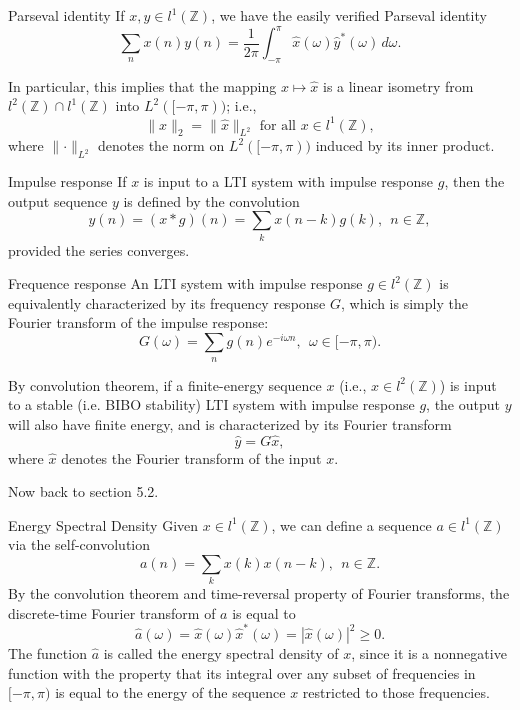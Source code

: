 \documentclass{article}
\begin{document}
\begin{misc}{Parseval identity}{}
If \( x,y \in l^1(\mathbb{Z} ) \), we have the easily verified Parseval identity
\[
    \sum_{n} x(n)y(n) = \frac{1}{2\pi }\int_{- \pi }^{\pi} \hat{x} (\omega )\hat{y} ^{\ast}(\omega )   \,d \omega  .
\]

In particular, this implies that the mapping \( x\mapsto \hat{x}   \) is a linear isometry from \( l^2(\mathbb{Z} ) \cap l^1 (\mathbb{Z} ) \) into \( L^2([-\pi, \pi )) \); i.e., 
\[
    \lVert x \rVert _2 = \lVert \hat{x}  \rVert _{L^2} \text{ for all } x \in  l^1(\mathbb{Z} ),
\] where \( \lVert \cdot  \rVert_{L^2}  \) denotes the norm on \( L^2([- \pi ,\pi )) \) induced by its inner product. 
\end{misc}


\begin{defn}{Impulse response}{}
    If \( x \) is input to a LTI system with impulse response \( g \), then the output sequence \( y \) is defined by the convolution 
    \[
        y(n) = (x \ast g)(n) = \sum_{k} x(n - k)g(k), \ \ n \in \mathbb{Z} ,
    \]
    provided the series converges. 
    \end{defn}
    
\begin{defn}{Frequence response}{}
An LTI system with impulse response \( g \in l^2(\mathbb{Z} ) \) is equivalently characterized by its frequency response \( G \), which is simply the Fourier transform of the impulse response:
\[
    G(\omega ) = \sum_{n} g(n)e^{- i \omega n}, \ \ \omega \in [- \pi , \pi ). 
\]
\end{defn}    
\begin{rmk}{}{}
    By convolution theorem, if a finite-energy sequence \( x \) (i.e., \( x\in l^2(\mathbb{Z} ) \)) is input to a stable (i.e. BIBO stability) LTI system with impulse response \( g \), the output \( y \) will also have finite energy, and is characterized by its Fourier transform
    \[
        \hat{y} = G \hat{x},
    \]
    where \( \hat{x}  \) denotes the Fourier transform of the input \( x \). 
\end{rmk}

Now back to section 5.2.



\begin{defn}{Energy Spectral Density}{}
Given \( x \in l^1(\mathbb{Z} )  \), we can define a sequence \( a \in l^1(\mathbb{Z} ) \) via the self-convolution 
\[
    a(n) = \sum_{k} x(k)x(n - k),  \ \ n \in \mathbb{Z}. 
\]
By the convolution theorem and time-reversal property of Fourier transforms, the discrete-time Fourier transform of \( a \) is equal to 
\[
    \hat{a} (\omega ) = \hat{x} (\omega )\hat{x} ^{\ast} (\omega ) = |\hat{x} (\omega )| ^{2} \geq 0. 
\]
The function \( \hat{a}  \) is called the energy spectral density of \( x \), since it is a nonnegative function with the property that its integral over any subset of frequencies in \( [- \pi , \pi ) \) is equal to the energy of the sequence \( x \) restricted to those frequencies. 
\end{defn}
\end{document}

